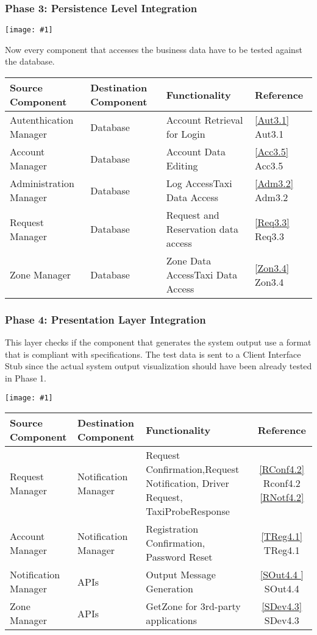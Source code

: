 \documentclass[11pt, a4paper,titlepage]{article}
\newcommand{\image}[1]{
	\begin{center}
		\noindent \texttt{[image: \#1]}
	\end{center}
}
\begin{document}
	\subsubsection{Phase 3: Persistence Level Integration}
	\image{test_phase3.png}
	Now every component that accesses the business data have to be tested against the database.
	\newline
	\begin{tabularx}{\textwidth}{| X |X |X |l|}
		\hline \textbf{Source Component} &\textbf{ Destination Component}&\textbf{Functionality} & \textbf{Reference} \\
		\hline Autenthication Manager & Database & Account Retrieval for Login & \ref{Aut3.1} Aut3.1\\
		\hline Account Manager & Database & Account Data Editing & \ref{Acc3.5} Acc3.5\\
		\hline Administration Manager & Database & Log Access\newline Taxi Data Access & \ref{Adm3.2} Adm3.2\\
		\hline Request Manager & Database & Request and Reservation data access & \ref{Req3.3} Req3.3\\
		\hline Zone Manager & Database & Zone Data Access\newline Taxi Data Access & \ref{Zon3.4} Zon3.4\\
		\hline
	\end{tabularx}
	\newline
	\newpage
	\subsubsection{Phase 4: Presentation Layer Integration}
	This layer checks if the component that generates the system output use a format that is compliant with specifications. The test data is sent to a Client Interface Stub since the actual system output visualization should have been already tested in Phase 1.
	\newline
	\image{test_phase4.png}
	\begin{tabularx}{\textwidth}{| X |X |X |c|}
		\hline \textbf{Source Component} &\textbf{ Destination Component}&\textbf{Functionality} & \textbf{Reference} \\
		\hline Request Manager & Notification Manager & Request Confirmation,\newline Request Notification, Driver Request,  TaxiProbeResponse & \ref{RConf4.2} Rconf4.2 \newline \ref{RNotf4.2}\\
		\hline Account Manager & Notification Manager & Registration Confirmation, Password Reset & \ref{TReg4.1} TReg4.1\\
		\hline Notification Manager & APIs & Output Message Generation & \ref{SOut4.4 } SOut4.4\\
		\hline Zone Manager & APIs & GetZone for 3rd-party applications & \ref{SDev4.3} SDev4.3\\
		\hline
	\end{tabularx}	
	\newpage
\end{document}
